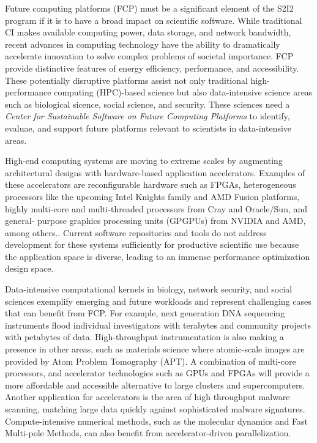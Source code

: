 Future computing platforms (FCP) must be a significant element of the S2I2 program if it is to have a broad impact on scientific software. While traditional CI makes available computing power, data storage, and network bandwidth, recent advances in computing technology have the ability to dramatically accelerate innovation to solve complex problems of societal importance. FCP provide distinctive features of energy efficiency, performance, and accessibility. These potentially disruptive platforms assist not only traditional high-performance computing (HPC)-based science but also data-intensive science areas such as biological sicence, social science, and security.  These sciences need a \textit{Center for Sustainable Software on Future Computing Platforms} to identify, evaluae, and support future platforms relevant to scientists in data-intensive areas.

High-end computing systems are moving to extreme scales by augmenting architectural designs with hardware-based application accelerators. Examples of these accelerators are reconfigurable hardware such as FPGAs, heterogeneous processors like the upcoming Intel Knights family and AMD Fusion platforms, highly multi-core and multi-threaded processors from Cray and Oracle/Sun, and general- purpose graphics processing units (GPGPUs) from NVIDIA and AMD, among others.. Current software repositories and tools do not address development for these systems sufficiently for productive scientific use because the application space is diverse, leading to an immense performance optimization design space.

Data-intensive computational kernels in biology, network security, and social sciences exemplify emerging and future workloads and represent challenging cases that can benefit from FCP. For example, next generation DNA sequencing instruments flood individual investigators with terabytes and community projects with petabytes of data. High-throughput instrumentation is also making a presence in other areas, such as materials science where atomic-scale images are provided by Atom Problem Tomography (APT). A combination of multi-core processors, and accelerator technologies such as GPUs and FPGAs will provide a more affordable and accessible alternative to large clusters and supercomputers. Another application for accelerators is the area of high throughput malware scanning, matching large data quickly against sophisticated malware signatures. Compute-intensive numerical methods, such as the molecular dynamics and Fast Multi-pole Methods, can also benefit from accelerator-driven parallelization.

